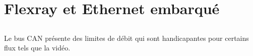 \documentclass[a4paper]{article}
\begin{document}
\section{Flexray et Ethernet embarqué}

\subsection{}
Le bus CAN présente des limites de débit qui sont handicapantes pour certains flux tels que la vidéo.

\subsection{}


\subsection{}
\end{document}
